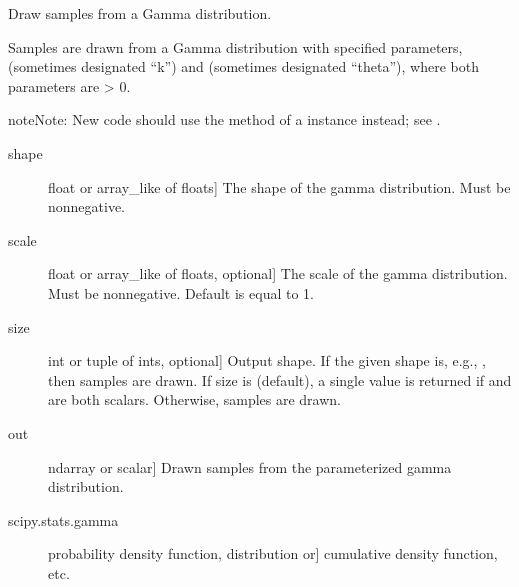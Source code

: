\documentclass[letterpaper,10pt,english]{sphinxmanual}
\begin{document}

\begin{fulllineitems}
\label{\detokenize{infrapy.utils:infrapy.utils.ref2sac.gamma}}
Draw samples from a Gamma distribution.

Samples are drawn from a Gamma distribution with specified parameters,
 (sometimes designated “k”) and  (sometimes designated
“theta”), where both parameters are \textgreater{} 0.

\begin{sphinxadmonition}{note}{Note:}
New code should use the  method of a 
instance instead; see .
\end{sphinxadmonition}
\begin{description}
\item[{shape}] \leavevmode{[}float or array\_like of floats{]}
The shape of the gamma distribution. Must be non\sphinxhyphen{}negative.

\item[{scale}] \leavevmode{[}float or array\_like of floats, optional{]}
The scale of the gamma distribution. Must be non\sphinxhyphen{}negative.
Default is equal to 1.

\item[{size}] \leavevmode{[}int or tuple of ints, optional{]}
Output shape.  If the given shape is, e.g., , then
 samples are drawn.  If size is  (default),
a single value is returned if  and  are both scalars.
Otherwise,  samples are drawn.

\end{description}
\begin{description}
\item[{out}] \leavevmode{[}ndarray or scalar{]}
Drawn samples from the parameterized gamma distribution.

\end{description}
\begin{description}
\item[{scipy.stats.gamma}] \leavevmode{[}probability density function, distribution or{]}
cumulative density function, etc.


\end{description}
\end{fulllineitems}
\end{document}
